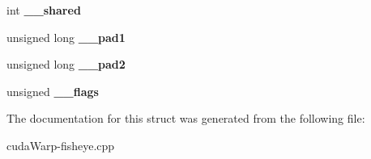 \begin{DoxyCompactItemize}
\item 
int {\bfseries \+\_\+\+\_\+shared}\hypertarget{struct____pthread__rwlock__arch__t_a44d3ef78f40d414e16164e54e19db432}{}\label{struct____pthread__rwlock__arch__t_a44d3ef78f40d414e16164e54e19db432}

\item 
unsigned long {\bfseries \+\_\+\+\_\+pad1}\hypertarget{struct____pthread__rwlock__arch__t_af1e79f7bd69736002ed304ec968357d3}{}\label{struct____pthread__rwlock__arch__t_af1e79f7bd69736002ed304ec968357d3}

\item 
unsigned long {\bfseries \+\_\+\+\_\+pad2}\hypertarget{struct____pthread__rwlock__arch__t_aa98c0ec8aadef0beec79a6642d5a4073}{}\label{struct____pthread__rwlock__arch__t_aa98c0ec8aadef0beec79a6642d5a4073}

\item 
unsigned {\bfseries \+\_\+\+\_\+flags}\hypertarget{struct____pthread__rwlock__arch__t_a5e070a98dcffe803390fb46a48850acb}{}\label{struct____pthread__rwlock__arch__t_a5e070a98dcffe803390fb46a48850acb}

\end{DoxyCompactItemize}


The documentation for this struct was generated from the following file\+:\begin{DoxyCompactItemize}
\item 
cuda\+Warp-\/fisheye.\+cpp\end{DoxyCompactItemize}
